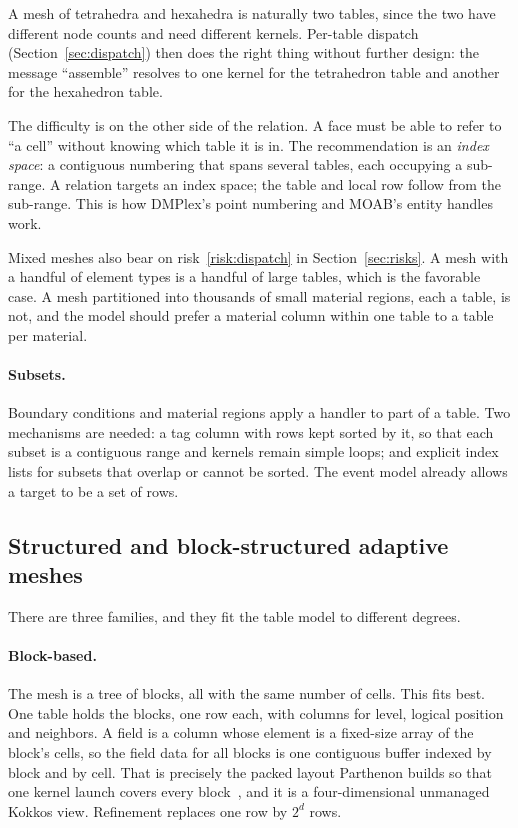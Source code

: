 \documentclass[11pt,a4paper]{article}
\begin{document}
A mesh of tetrahedra and hexahedra is naturally two tables, since the two
have different node counts and need different kernels.  Per-table dispatch
(Section~\ref{sec:dispatch}) then does the right thing without further
design: the message \enquote{assemble} resolves to one kernel for the
tetrahedron table and another for the hexahedron table.

The difficulty is on the other side of the relation.  A face must be able to
refer to \enquote{a cell} without knowing which table it is in.  The
recommendation is an \emph{index space}: a contiguous numbering that spans
several tables, each occupying a sub-range.  A relation targets an index
space; the table and local row follow from the sub-range.  This is how
DMPlex's point numbering and MOAB's entity handles work.

Mixed meshes also bear on risk~\ref{risk:dispatch} in Section~\ref{sec:risks}.  A mesh
with a handful of element types is a handful of large tables, which is the
favorable case.  A mesh partitioned into thousands of small material
regions, each a table, is not, and the model should prefer a material column
within one table to a table per material.

\paragraph{Subsets.}  Boundary conditions and material regions apply a
handler to part of a table.  Two mechanisms are needed: a tag column with
rows kept sorted by it, so that each subset is a contiguous range and kernels
remain simple loops; and explicit index lists for subsets that overlap or
cannot be sorted.  The event model already allows a target to be a set of
rows.

\subsection{Structured and block-structured adaptive meshes}

There are three families, and they fit the table model to different degrees.

\paragraph{Block-based.}  The mesh is a tree of blocks, all with the same
number of cells.  This fits best.  One table holds the blocks, one row each,
with columns for level, logical position and neighbors.  A field is a column
whose element is a fixed-size array of the block's cells, so the field data
for all blocks is one contiguous buffer indexed by block and by cell.  That
is precisely the packed layout Parthenon builds so that one kernel launch
covers every block~\cite{parthenon}, and it is a four-dimensional unmanaged
Kokkos view.  Refinement replaces one row by $2^d$ rows.
\end{document}
